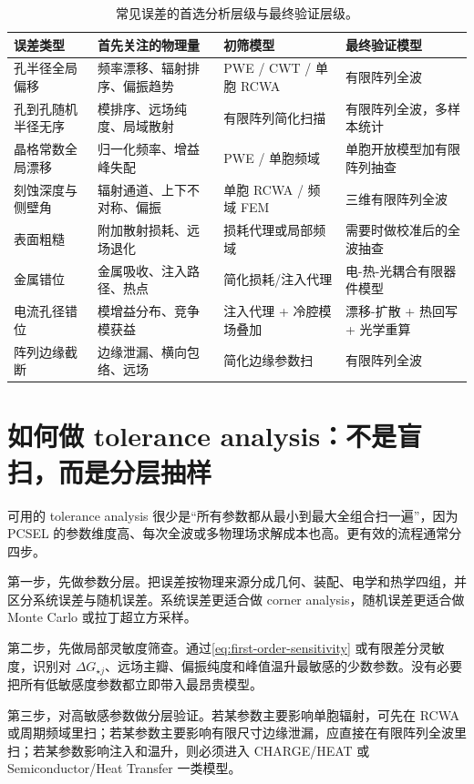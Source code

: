 \begin{table}[htbp]
  \centering
  \footnotesize
  \caption{常见误差的首选分析层级与最终验证层级。}
  \label{tab:robustness-model-choice}
  \setlength{\tabcolsep}{4pt}
  \begin{tabularx}{\textwidth}{@{}p{2.3cm}p{3.7cm}Y Y@{}}
    \toprule
    误差类型 & 首先关注的物理量 & 初筛模型 & 最终验证模型 \\
    \midrule
    孔半径全局偏移 & 频率漂移、辐射排序、偏振趋势 & PWE / CWT / 单胞 RCWA & 有限阵列全波 \\
    孔到孔随机半径无序 & 模排序、远场纯度、局域散射 & 有限阵列简化扫描 & 有限阵列全波，多样本统计 \\
    晶格常数全局漂移 & 归一化频率、增益峰失配 & PWE / 单胞频域 & 单胞开放模型加有限阵列抽查 \\
    刻蚀深度与侧壁角 & 辐射通道、上下不对称、偏振 & 单胞 RCWA / 频域 FEM & 三维有限阵列全波 \\
    表面粗糙 & 附加散射损耗、远场退化 & 损耗代理或局部频域 & 需要时做校准后的全波抽查 \\
    金属错位 & 金属吸收、注入路径、热点 & 简化损耗/注入代理 & 电-热-光耦合有限器件模型 \\
    电流孔径错位 & 模增益分布、竞争模获益 & 注入代理 + 冷腔模场叠加 & 漂移-扩散 + 热回写 + 光学重算 \\
    阵列边缘截断 & 边缘泄漏、横向包络、远场 & 简化边缘参数扫 & 有限阵列全波 \\
    \bottomrule
  \end{tabularx}
\end{table}

\section{如何做 tolerance analysis：不是盲扫，而是分层抽样}
可用的 tolerance analysis 很少是“所有参数都从最小到最大全组合扫一遍”，因为 PCSEL 的参数维度高、每次全波或多物理场求解成本也高。更有效的流程通常分四步。

第一步，先做参数分层。把误差按物理来源分成几何、装配、电学和热学四组，并区分系统误差与随机误差。系统误差更适合做 corner analysis，随机误差更适合做 Monte Carlo 或拉丁超立方采样。

第二步，先做局部灵敏度筛查。通过\cref{eq:first-order-sensitivity} 或有限差分灵敏度，识别对 $\Delta G_{\star j}$、远场主瓣、偏振纯度和峰值温升最敏感的少数参数。没有必要把所有低敏感度参数都立即带入最昂贵模型。

第三步，对高敏感参数做分层验证。若某参数主要影响单胞辐射，可先在 RCWA 或周期频域里扫；若某参数主要影响有限尺寸边缘泄漏，应直接在有限阵列全波里扫；若某参数影响注入和温升，则必须进入 CHARGE/HEAT 或 Semiconductor/Heat Transfer 一类模型。

